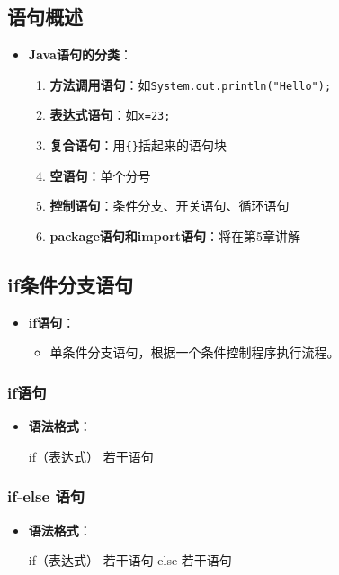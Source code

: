 \documentclass[a4paper, 10pt]{ctexart}
\begin{document}
\subsection{语句概述}
\begin{itemize}
  \item \textbf{Java语句的分类}：
  \begin{enumerate}
    \item \textbf{方法调用语句}：如\texttt{System.out.println("Hello");}
    \item \textbf{表达式语句}：如\texttt{x=23;}
    \item \textbf{复合语句}：用\texttt{\{\}}括起来的语句块
    \item \textbf{空语句}：单个分号
    \item \textbf{控制语句}：条件分支、开关语句、循环语句
    \item \textbf{package语句和import语句}：将在第5章讲解
  \end{enumerate}
\end{itemize}

\subsection{if条件分支语句}
\begin{itemize}
  \item \textbf{if语句}：
  \begin{itemize}
    \item 单条件分支语句，根据一个条件控制程序执行流程。
  \end{itemize}
\end{itemize}

\subsubsection{if语句}
\begin{itemize}
  \item \textbf{语法格式}：
  \begin{codeblock}
if（表达式） { 
    若干语句
}
  \end{codeblock}
\end{itemize}

\subsubsection{if-else 语句}
\begin{itemize}
  \item \textbf{语法格式}：
  \begin{codeblock}
if（表达式） {
    若干语句
} else {
    若干语句
}
  \end{codeblock}
\end{itemize}
\end{document}
